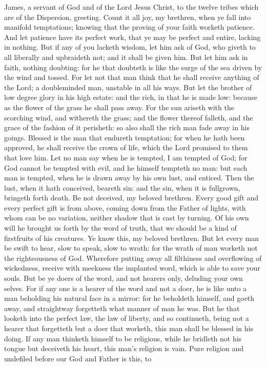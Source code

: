 


James, a servant of God and of the Lord Jesus Christ, to the twelve tribes which are of the Dispersion, greeting.  Count it all joy, my brethren, when ye fall into manifold temptations; knowing that the proving of your faith worketh patience. And let patience have its perfect work, that ye may be perfect and entire, lacking in nothing.  But if any of you lacketh wisdom, let him ask of God, who giveth to all liberally and upbraideth not; and it shall be given him. But let him ask in faith, nothing doubting: for he that doubteth is like the surge of the sea driven by the wind and tossed. For let not that man think that he shall receive anything of the Lord; a doubleminded man, unstable in all his ways.  But let the brother of low degree glory in his high estate: and the rich, in that he is made low: because as the flower of the grass he shall pass away. For the sun ariseth with the scorching wind, and withereth the grass; and the flower thereof falleth, and the grace of the fashion of it perisheth: so also shall the rich man fade away in his goings.  Blessed is the man that endureth temptation; for when he hath been approved, he shall receive the crown of life, which the Lord promised to them that love him. Let no man say when he is tempted, I am tempted of God; for God cannot be tempted with evil, and he himself tempteth no man: but each man is tempted, when he is drawn away by his own lust, and enticed. Then the lust, when it hath conceived, beareth sin: and the sin, when it is fullgrown, bringeth forth death. Be not deceived, my beloved brethren. Every good gift and every perfect gift is from above, coming down from the Father of lights, with whom can be no variation, neither shadow that is cast by turning. Of his own will he brought us forth by the word of truth, that we should be a kind of firstfruits of his creatures.  Ye know this, my beloved brethren. But let every man be swift to hear, slow to speak, slow to wrath: for the wrath of man worketh not the righteousness of God. Wherefore putting away all filthiness and overflowing of wickedness, receive with meekness the implanted word, which is able to save your souls. But be ye doers of the word, and not hearers only, deluding your own selves. For if any one is a hearer of the word and not a doer, he is like unto a man beholding his natural face in a mirror: for he beholdeth himself, and goeth away, and straightway forgetteth what manner of man he was. But he that looketh into the perfect law, the law of liberty, and so continueth, being not a hearer that forgetteth but a doer that worketh, this man shall be blessed in his doing. If any man thinketh himself to be religious, while he bridleth not his tongue but deceiveth his heart, this man’s religion is vain. Pure religion and undefiled before our God and Father is this, to 